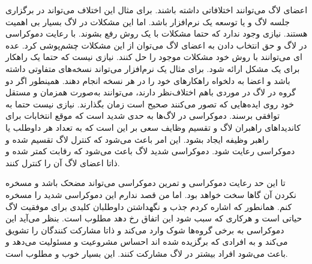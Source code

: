اعضای لاگ می‌توانند اختلافاتی داشته باشند. برای مثال این اختلاف می‌تواند در برگزاری جلسه لاگ و یا توسعه یک نرم‌افزار
باشد. اما این مشکلات در لاگ بسیار بی اهمیت هستند. نیازی وجود ندارد که حتما مشکلات با یک روش رفع بشوند.
با رعایت دموکراسی در لاگ و حق انتخاب دادن به اعضای لاگ می‌توان از این مشکلات چشم‌پوشی کرد.
عده ای می‌توانند با روش خود مشکلات موجود را حل کنند. نیازی نیست که حتما یک راهکار برای یک مشکل ارائه شود.
برای مثال یک نرم‌افزار می‌تواند نسخه‌های متفاوتی داشته باشد و اعضا به دلخواه راهکارهای خود را در هر نسخه انجام دهند.
همینطور اگر دو گروه در لاگ در موردی باهم اختلاف‌نظر دارند، می‌توانند به‌صورت همزمان و مستقل خود روی ایده‌هایی
که تصور می‌کنند صحیح است زمان بگذارند. نیازی نیست حتما به توافقی برسند.
دموکراسی در لاگ‌ها به حدی شدید است که موقع انتخابات برای کاندیداهای راهبران لاگ و تقسیم وظایف سعی بر این است
که به تعداد هر داوطلب یا راهبر وظیفه ایجاد بشود. این امر باعث می‌شود که کنترل لاگ تقسیم شده و دموکراسی رعایت شود.
دموکراسی شدید لاگ باعث می‌شود که رقابت کمتر شده و ذاتا اعضای لاگ آن را کنترل کنند.


تا این حد رعایت دموکراسی و تمرین دموکراسی می‌تواند مضحک باشد و مسخره نکردن آن گاها سخت خواهد بود.
اما من قصد ندارم این دموکراسی شدید را مسخره کنم.
همانطور که اشاره کردم جذب و نگهداشتن داوطلبان کلیدی برای موفقیت لاگ حیاتی است و هرکاری
که سبب شود این اتفاق رخ دهد مطلوب است. بنظر می‌آید این دموکراسی به برخی گروه‌ها
شوک وارد می‌کند و ذاتا مشارکت کنندگان را تشویق می‌کند و به افرادی که برگزیده شده اند احساس
مشروعیت و مسئولیت می‌دهد و باعث می‌شود افراد بیشتر در لاگ مشارکت کنند. این بسیار خوب و مطلوب است.

